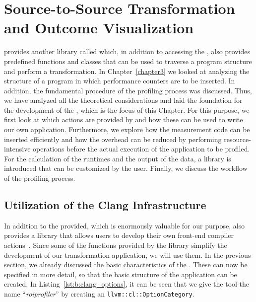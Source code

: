 \chapter{Source-to-Source Transformation and Outcome Visualization}
\label{chapter4}
\CLANG provides another library called \LIBTOOLING which, in addition to accessing the \astsmall, also provides predefined functions and classes that can be used to traverse a program structure and perform a \SOUTOSOU transformation. In Chapter~\ref{chapter3} we looked at analyzing the structure of a program in which performance counters are to be inserted. In addition, the fundamental procedure of the profiling process was discussed. Thus, we have analyzed all the theoretical considerations and laid the foundation for the development of the \TOOL, which is the focus of this Chapter. For this purpose, we first look at which actions are provided by \CLANG and how these can be used to write our own application. Furthermore, we explore how the measurement code can be inserted efficiently and how the overhead can be reduced by performing resource-intensive operations before the actual execution of the application to be profiled. For the calculation of the runtimes and the output of the data, a library is introduced that can be customized by the user. Finally, we discuss the workflow of the profiling process.

\section{Utilization of the Clang Infrastructure}
In addition to the \astsmall provided, which is enormously valuable for our purpose, \CLANG also provides a library that allows users to develop their own front-end compiler actions~\cite{ClangTooling}. Since some of the functions provided by the library simplify the development of our \SOUTOSOU transformation application, we will use them. In the previous section, we already discussed the basic characteristics of the \TOOL. These can now be specified in more detail, so that the basic structure of the application can be created. In Listing~\ref{lst:b:clang_options}, it can be seen that we give the tool the name ``\emph{roiprofiler}'' by creating an \lstinline{llvm::cl::OptionCategory}.

